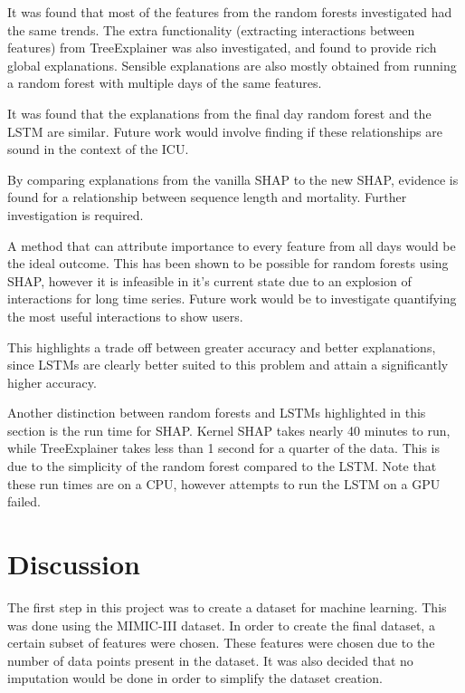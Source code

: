 \documentclass[12pt]{article}
\begin{document}
It was found that most of the features from the random forests investigated had the same trends. The extra functionality (extracting interactions between features) from TreeExplainer was also investigated, and found to provide rich global explanations. Sensible explanations are also mostly obtained from running a random forest with multiple days of the same features. 


It was found that the explanations from the final day random forest and the LSTM are similar. Future work would involve finding if these relationships are sound in the context of the ICU.

By comparing explanations from the vanilla SHAP to the new SHAP, evidence is found for a relationship between sequence length and mortality. Further investigation is required.

A method that can attribute importance to every feature from all days would be the ideal outcome. This has been shown to be possible for random forests using SHAP, however it is infeasible in it's current state due to an explosion of interactions for long time series. Future work would be to investigate quantifying the most useful interactions to show users. 

This highlights a trade off between greater accuracy and better explanations, since LSTMs are clearly better suited to this problem and attain a significantly higher accuracy.

Another distinction between random forests and LSTMs highlighted in this section is the run time for SHAP. Kernel SHAP takes nearly 40 minutes to run, while TreeExplainer takes less than 1 second for a quarter of the data. This is due to the simplicity of the random forest compared to the LSTM. Note that these run times are on a CPU, however attempts to run the LSTM on a GPU failed. 

\section{Discussion}

The first step in this project was to create a dataset for machine learning. This was done using the MIMIC-III dataset. In order to create the final dataset, a certain subset of features were chosen. These features were chosen due to the number of data points present in the dataset. It was also decided that no imputation would be done in order to simplify the dataset creation.
\end{document}
